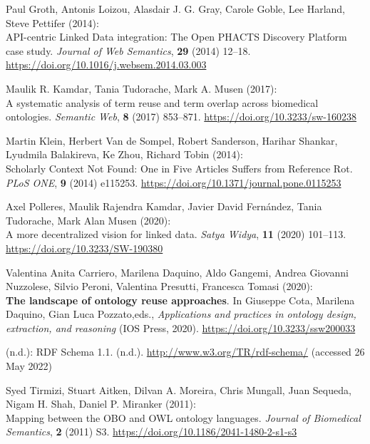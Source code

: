 \begin{thebibliography}{9}
Paul Groth, Antonis Loizou, Alasdair J. G. Gray, Carole Goble, Lee
Harland, Steve Pettifer (2014): \\
{API-centric Linked Data}
integration: {The Open PHACTS Discovery Platform} case study.
\emph{Journal of Web Semantics}, \textbf{29} (2014) 12--18.
\url{https://doi.org/10.1016/j.websem.2014.03.003}

Maulik R. Kamdar, Tania Tudorache, Mark A. Musen (2017): \\
A systematic
analysis of term reuse and term overlap across biomedical ontologies.
\emph{Semantic Web}, \textbf{8} (2017) 853--871.
\url{https://doi.org/10.3233/sw-160238}

Martin Klein, Herbert Van de Sompel, Robert Sanderson, Harihar Shankar,
Lyudmila Balakireva, Ke Zhou, Richard Tobin (2014): \\
Scholarly
{Context Not Found}: {One} in {Five Articles Suffers} from {Reference
Rot}. \emph{PLoS ONE}, \textbf{9} (2014) e115253.
\url{https://doi.org/10.1371/journal.pone.0115253}

Axel Polleres, Maulik Rajendra Kamdar, Javier David Fernández, Tania
Tudorache, Mark Alan Musen (2020): \\
A more decentralized vision for
linked data. \emph{Satya Widya}, \textbf{11} (2020) 101--113.
\url{https://doi.org/10.3233/SW-190380}

Valentina Anita Carriero, Marilena Daquino, Aldo Gangemi, Andrea
Giovanni Nuzzolese, Silvio Peroni, Valentina Presutti, Francesca
Tomasi (2020): \\
\textbf{The landscape of ontology reuse approaches}. In
Giuseppe Cota, Marilena Daquino, Gian Luca Pozzato,eds.,
\emph{Applications and practices in ontology design, extraction, and
reasoning} ({IOS Press}, 2020).
\url{https://doi.org/10.3233/ssw200033}

(n.d.): {RDF Schema} 1.1. (n.d.). \url{http://www.w3.org/TR/rdf-schema/}
(accessed 26 May 2022)

Syed Tirmizi, Stuart Aitken, Dilvan A. Moreira, Chris Mungall, Juan
Sequeda, Nigam H. Shah, Daniel P. Miranker (2011): \\
Mapping between
the {OBO} and {OWL} ontology languages. \emph{Journal of Biomedical
Semantics}, \textbf{2} (2011) S3.
\url{https://doi.org/10.1186/2041-1480-2-s1-s3}


\end{thebibliography}
